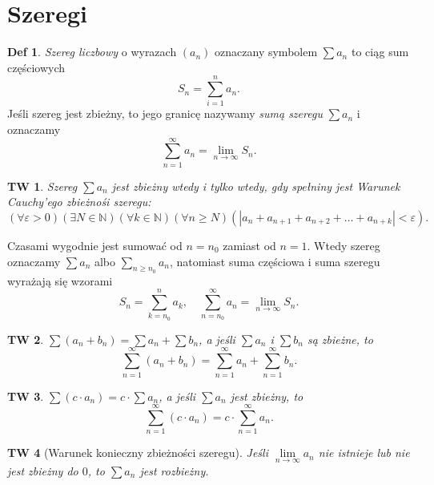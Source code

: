 \documentclass[a4paper, 12pt]{mwart}
\theoremstyle{definition}
\newtheorem{definicja}{Def}[section]
\theoremstyle{plain}
\newtheorem{twierdzenie}{TW}[section]
\theoremstyle{remark}
\begin{document}
\section{Szeregi}
\begin{definicja}
	\emph{Szereg liczbowy} o wyrazach $(a_n)$ \ppauza oznaczany symbolem $\sum a_n$ \ppauza to ciąg sum częściowych
	\begin{equation}
		S_n = \sum_{i = 1}^n a_n.
	\end{equation}
	Jeśli szereg jest zbieżny, to jego granicę nazywamy \emph{sumą szeregu} $\sum a_n$ i oznaczamy
	\begin{equation}
		\sum_{n=1}^\infty a_n = \lim_{n\to\infty} S_n.
	\end{equation}
\end{definicja}
\begin{twierdzenie}
	Szereg $\sum a_n$ jest zbieżny wtedy i tylko wtedy, gdy spełniny jest \emph{Warunek Cauchy'ego zbieżnośi szeregu}:
	\begin{equation}
		(\forall \varepsilon > 0)(\exists N\in\mathbb{N})(\forall k\in\mathbb{N})(\forall n \geq N)(|a_n + a_{n+1} + a_{n+2} + \ldots + a_{n+k}| < \varepsilon).
	\end{equation}
\end{twierdzenie}
\noindent Czasami wygodnie jest sumować od $n = n_0$ zamiast od $n = 1$. Wtedy szereg oznaczamy $\sum a_n$ albo $\sum\limits_{n\geq n_0}a_n$, natomiast suma częściowa i suma szeregu wyrażają się wzorami
\begin{equation}
	S_n = \sum_{k = n_0}^n a_k, \quad \sum_{n = n_0}^\infty a_n = \lim_{n\to\infty} S_n.
\end{equation}
\begin{twierdzenie}
	$\sum(a_n + b_n) = \sum a_n + \sum b_n$, a jeśli $\sum a_n$ i $\sum b_n$ są zbieżne, to
	\begin{equation}
		\sum_{n=1}^\infty(a_n + b_n) = \sum_{n=1}^\infty a_n + \sum_{n=1}^\infty b_n.
	\end{equation}
\end{twierdzenie}
\begin{twierdzenie}
	$\sum(c\cdot a_n) = c\cdot\sum a_n$, a jeśli $\sum a_n$ jest zbieżny, to
	\begin{equation}
		\sum_{n=1}^\infty(c\cdot a_n) = c\cdot \sum_{n=1}^\infty a_n.
	\end{equation}
\end{twierdzenie}
\begin{twierdzenie}[Warunek konieczny zbieżności szeregu]
	Jeśli $\lim\limits_{n\to\infty} a_n$ nie istnieje lub nie jest zbieżny do $0$, to $\sum a_n$ jest rozbieżny.
\end{twierdzenie}
\end{document}
